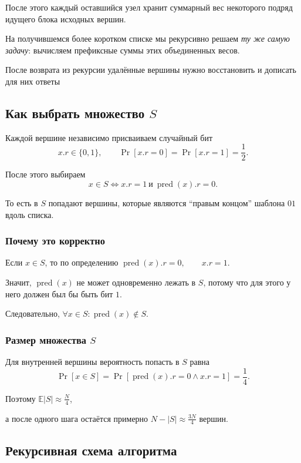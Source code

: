 	После этого каждый оставшийся узел хранит суммарный вес некоторого подряд идущего блока исходных вершин.
	
	На получившемся более коротком списке мы рекурсивно решаем \emph{ту же самую задачу}: вычисляем префиксные суммы этих объединенных весов.
	
	После возврата из рекурсии удалённые вершины нужно восстановить и дописать для них ответы
	
	\subsection{Как выбрать множество \(S\)}
	
	Каждой вершине независимо присваиваем случайный бит
	\[
	x.r\in\{0,1\},
	\qquad
	\Pr[x.r=0]=\Pr[x.r=1]=\frac12.
	\]
	
	После этого выбираем
	\[
	x\in S
	\iff
	x.r=1 \ \text{и}\ \operatorname{pred}(x).r=0.
	\]
	
	То есть в $S$ попадают вершины, которые являются ``правым концом'' шаблона $01$ вдоль списка.
	
	\subsubsection*{Почему это корректно}
	
	Если $x\in S$, то по определению $\operatorname{pred}(x).r=0,\qquad x.r=1$.

	Значит, $\operatorname{pred}(x)$ не может одновременно лежать в $S$, потому что для этого у него должен был бы быть бит $1$.
	
	Следовательно, $\forall x\in S\colon \operatorname{pred}(x)\notin S$.
	
	\subsubsection*{Размер множества $S$}
	
	Для внутренней вершины вероятность попасть в $S$ равна
	\[
	\Pr[x\in S]=\Pr[\operatorname{pred}(x).r=0 \land x.r=1]=\frac14.
	\]
	
	Поэтому $\mathbb{E}|S| \approx \frac{N}{4}$,

	а после одного шага остаётся примерно $N-|S| \approx \frac{3N}{4}$
	вершин.
	
	\subsection{Рекурсивная схема алгоритма}
	
